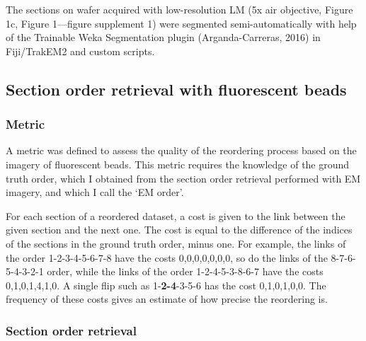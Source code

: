 \documentclass{article}
\begin{document}
The sections on wafer acquired with low-resolution LM (5x air objective, Figure 1c, Figure 1---figure supplement 1) were segmented semi-automatically with help of the Trainable Weka Segmentation plugin (Arganda-Carreras, 2016) in Fiji/TrakEM2 and custom scripts.

\subsection*{Section order retrieval with fluorescent beads}

\subsubsection*{Metric}

A metric was defined to assess the quality of the reordering process based on the imagery of fluorescent beads. This metric requires the knowledge of the ground truth order, which I obtained from the section order retrieval performed with EM imagery, and which I call the ‘EM order’.

For each section of a reordered dataset, a cost is given to the link between the given section and the next one. The cost is equal to the difference of the indices of the sections in the ground truth order, minus one. For example, the links of the order 1-2-3-4-5-6-7-8 have the costs 0,0,0,0,0,0,0, so do the links of the 8-7-6-5-4-3-2-1 order, while the links of the order 1-2-4-5-3-8-6-7 have the costs 0,1,0,1,4,1,0. A single flip such as 1-\textbf{2-4}-3-5-6 has the cost 0,1,0,1,0,0. The frequency of these costs gives an estimate of how precise the reordering is.

\subsubsection*{Section order retrieval}
\end{document}
